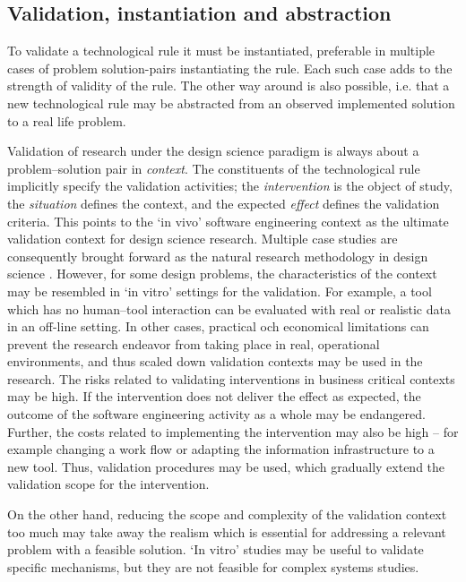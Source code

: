 \documentclass[graybox]{svmult}
\begin{document}
\subsection{Validation, instantiation and abstraction}

To validate a technological rule it must be instantiated, preferable in multiple cases of problem solution-pairs instantiating the rule. Each such case adds to the strength of validity of the rule. The other way around is also possible, i.e. that a new technological rule may be abstracted from an observed implemented solution to a real life problem.

Validation of research under the design science paradigm is always about a problem--solution pair in \emph{context}. The constituents of the technological rule implicitly specify the validation activities; the \emph{intervention} is the object of study, the \emph{situation} defines the context, and the expected \emph{effect} defines the validation criteria. This points to the `in vivo' software engineering context as the ultimate validation context for design science research. Multiple case studies are consequently brought forward as the natural research methodology in design science \cite{van_aken_management_2004}. However, for some design problems, the characteristics of the context may be resembled in `in vitro' settings for the validation. For example, a tool which has no human--tool interaction can be evaluated with real or realistic data in an off-line setting. In other cases, practical och economical limitations can prevent the research endeavor from taking place in real, operational environments, and thus scaled down validation contexts may be used in the research. 
The risks related to validating interventions in business critical contexts may be high. If the intervention does not deliver the effect as expected, the outcome of the software engineering activity as a whole may be endangered. Further, the costs related to implementing the intervention may also be high -- for example changing a work flow or adapting the information infrastructure to a new tool. Thus, validation procedures may be used, which gradually extend the validation scope for the intervention.

On the other hand, reducing the scope and complexity of the validation context too much may take away the realism which is essential for addressing a relevant problem with a feasible solution. `In vitro' studies may be useful to validate specific mechanisms, but they are not feasible for complex systems studies.  
\end{document}
